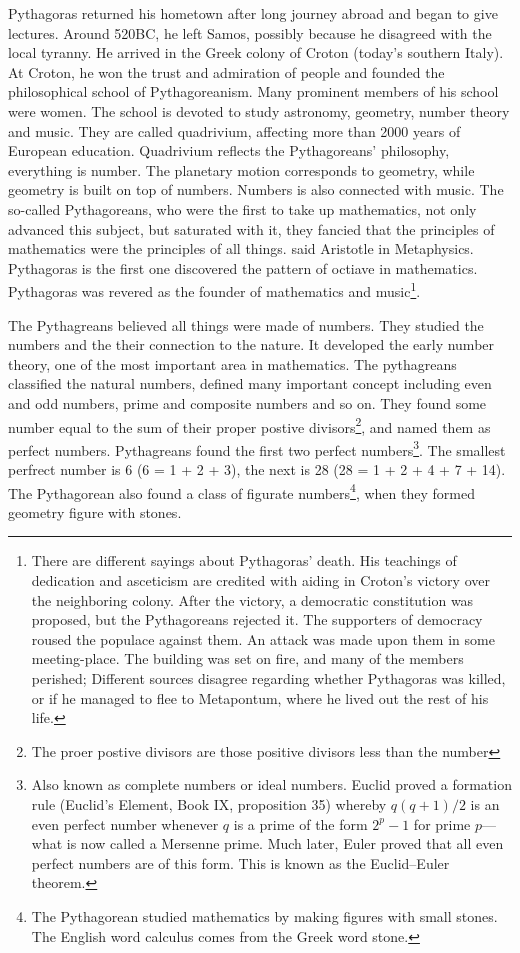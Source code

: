 \documentclass{article}
\begin{document}
Pythagoras returned his hometown after long journey abroad and began to give lectures. Around 520BC, he left Samos, possibly because he disagreed with the local tyranny. He arrived in the Greek colony of Croton (today's southern Italy). At Croton, he won the trust and admiration of people and founded the philosophical school of Pythagoreanism. Many prominent members of his school were women. The school is devoted to study astronomy, geometry, number theory and music. They are called quadrivium, affecting more than 2000 years of European education\cite{StepanovRose15}. Quadrivium reflects the Pythagoreans' philosophy, everything is number. The planetary motion corresponds to geometry, while geometry is built on top of numbers. Numbers is also connected with music. The so-called Pythagoreans, who were the first to take up mathematics, not only advanced this subject, but saturated with it, they fancied that the principles of mathematics were the principles of all things. said Aristotle in Metaphysics. Pythagoras is the first one discovered the pattern of octiave in mathematics. Pythagoras was revered as the founder of mathematics and music\footnote{There are different sayings about Pythagoras' death. His teachings of dedication and asceticism are credited with aiding in Croton's victory over the neighboring colony. After the victory, a democratic constitution was proposed, but the Pythagoreans rejected it. The supporters of democracy roused the populace against them. An attack was made upon them in some meeting-place. The building was set on fire, and many of the members perished; Different sources disagree regarding whether Pythagoras was killed, or if he managed to flee to Metapontum, where he lived out the rest of his life.}.

The Pythagreans believed all things were made of numbers. They studied the numbers and the their connection to the nature. It developed the early number theory, one of the most important area in mathematics. The pythagreans classified the natural numbers, defined many important concept including even and odd numbers, prime and composite numbers and so on. They found some number equal to the sum of their proper postive divisors\footnote{The proer postive divisors are those positive divisors less than the number}, and named them as perfect numbers. Pythagreans found the first two perfect numbers\footnote{Also known as complete numbers or ideal numbers. Euclid proved a formation rule (Euclid's Element, Book IX, proposition 35) whereby $q(q+1)/2$ is an even perfect number whenever $q$ is a prime of the form $2^p-1$ for prime $p$—what is now called a Mersenne prime. Much later, Euler proved that all even perfect numbers are of this form. This is known as the Euclid–Euler theorem.}. The smallest perfrect number is 6 (6 = 1 + 2 + 3), the next is 28 (28 = 1 + 2 + 4 + 7 + 14). The Pythagorean also found a class of figurate numbers\footnote{The Pythagorean studied mathematics by making figures with small stones. The English word calculus comes from the Greek word stone\cite{HanXueTao16}.}, when they formed geometry figure with stones.
\end{document}
